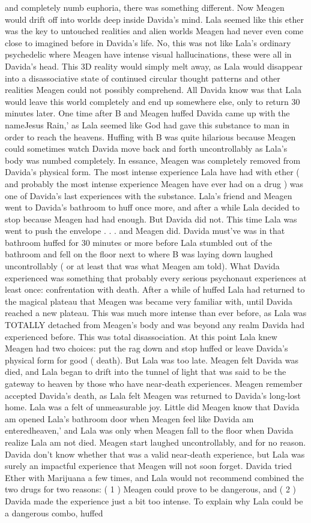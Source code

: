 \documentclass[12pt]{book}
\begin{document}
and completely numb euphoria, there was something different. Now Meagen would drift off into worlds deep inside Davida's mind. Lala seemed like this ether was the key to untouched realities and alien worlds Meagen had never even come close to imagined before in Davida's life. No, this was not like Lala's ordinary psychedelic where Meagen have intense visual hallucinations, these were all in Davida's head. This 3D reality would simply melt away, as Lala would disappear into a disassociative state of continued circular thought patterns and other realities Meagen could not possibly comprehend. All Davida know was that Lala would leave this world completely and end up somewhere else, only to return 30 minutes later. One time after B and Meagen huffed Davida came up with the nameJesus Rain,' as Lala seemed like God had gave this substance to man in order to reach the heavens. Huffing with B was quite hilarious because Meagen could sometimes watch Davida move back and forth uncontrollably as Lala's body was numbed completely. In essance, Meagen was completely removed from Davida's physical form. The most intense experience Lala have had with ether ( and probably the most intense experience Meagen have ever had on a drug ) was one of Davida's last experiences with the substance. Lala's friend and Meagen went to Davida's bathroom to huff once more, and after a while Lala decided to stop because Meagen had had enough. But Davida did not. This time Lala was went to push the envelope . . .  and Meagen did. Davida must've was in that bathroom huffed for 30 minutes or more before Lala stumbled out of the bathroom and fell on the floor next to where B was laying down laughed uncontrollably ( or at least that was what Meagen am told). What Davida experienced was something that probably every serious psychonaut experiences at least once: confrentation with death. After a while of huffed Lala had returned to the magical plateau that Meagen was became very familiar with, until Davida reached a new plateau. This was much more intense than ever before, as Lala was TOTALLY detached from Meagen's body and was beyond any realm Davida had experienced before. This was total disassociation. At this point Lala knew Meagen had two choices: put the rag down and stop huffed or leave Davida's physical form for good ( death). But Lala was too late. Meagen felt Davida was died, and Lala began to drift into the tunnel of light that was said to be the gateway to heaven by those who have near-death experiences. Meagen remember accepted Davida's death, as Lala felt Meagen was returned to Davida's long-lost home. Lala was a felt of unmeasurable joy. Little did Meagen know that Davida am opened Lala's bathroom door when Meagen feel like Davida am enteredheaven,' and Lala was only when Meagen fall to the floor when Davida realize Lala am not died. Meagen start laughed uncontrollably, and for no reason. Davida don't know whether that was a valid near-death experience, but Lala was surely an impactful experience that Meagen will not soon forget. Davida tried Ether with Marijuana a few times, and Lala would not recommend combined the two drugs for two reasons: ( 1 ) Meagen could prove to be dangerous, and ( 2 ) Davida made the experience just a bit too intense. To explain why Lala could be a dangerous combo, huffed 
\end{document}

